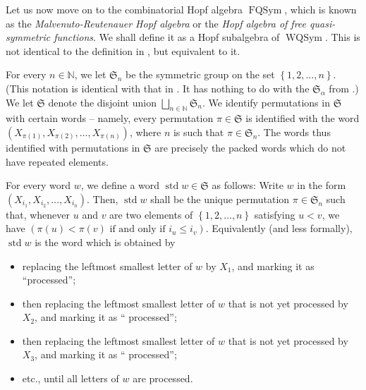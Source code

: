 \documentclass
[numbers=enddot,12pt,final,onecolumn,notitlepage,abstracton]{scrartcl}%
\theoremstyle{definition}
\begin{document}
Let us now move on to the combinatorial Hopf algebra $\operatorname*{FQSym}$,
which is known as the \textit{Malvenuto-Reutenauer Hopf algebra} or the
\textit{Hopf algebra of free quasi-symmetric functions}. We shall define it as
a Hopf subalgebra of $\operatorname*{WQSym}$. This is not identical to the
definition in \cite[Section 8.1]{Reiner}, but equivalent to it.

For every $n\in\mathbb{N}$, we let $\mathfrak{S}_{n}$ be the symmetric group
on the set $\left\{  1,2,\ldots,n\right\}  $. (This notation is identical with
that in \cite{Reiner}. It has nothing to do with the $\mathfrak{S}_{\alpha}$
from \cite{BBSSZ}.) We let $\mathfrak{S}$ denote the disjoint union
$\bigsqcup_{n\in\mathbb{N}}\mathfrak{S}_{n}$. We identify permutations in
$\mathfrak{S}$ with certain words -- namely, every permutation $\pi
\in\mathfrak{S}$ is identified with the word $\left(  X_{\pi\left(  1\right)
},X_{\pi\left(  2\right)  },\ldots,X_{\pi\left(  n\right)  }\right)  $, where
$n$ is such that $\pi\in\mathfrak{S}_{n}$. The words thus identified with
permutations in $\mathfrak{S}$ are precisely the packed words which do not
have repeated elements.

For every word $w$, we define a word $\operatorname*{std}w\in\mathfrak{S}$ as
follows: Write $w$ in the form $\left(  X_{i_{1}},X_{i_{2}},\ldots,X_{i_{n}%
}\right)  $. Then, $\operatorname*{std}w$ shall be the unique permutation
$\pi\in\mathfrak{S}_{n}$ such that, whenever $u$ and $v$ are two elements of
$\left\{  1,2,\ldots,n\right\}  $ satisfying $u<v$, we have $\left(
\pi\left(  u\right)  <\pi\left(  v\right)  \text{ if and only if }i_{u}\leq
i_{v}\right)  $. Equivalently (and less formally), $\operatorname*{std}w$ is
the word which is obtained by

\begin{itemize}
\item replacing the leftmost smallest letter of $w$ by $X_{1}$, and marking it
as \textquotedblleft processed\textquotedblright;

\item then replacing the leftmost smallest letter of $w$ that is not yet
processed by $X_{2}$, and marking it as \textquotedblleft
processed\textquotedblright;

\item then replacing the leftmost smallest letter of $w$ that is not yet
processed by $X_{3}$, and marking it as \textquotedblleft
processed\textquotedblright;

\item etc., until all letters of $w$ are processed.
\end{itemize}
\end{document}

